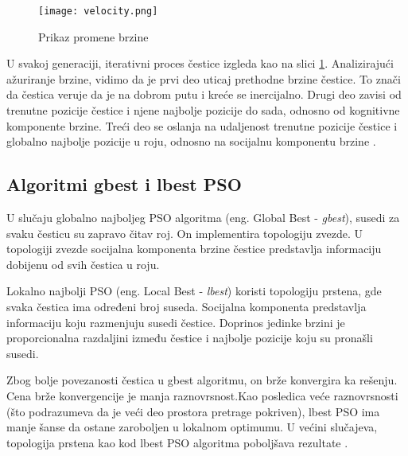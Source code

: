 \documentclass[a4paper]{article}
\begin{document}
\begin{figure}[htp]
    \centering
    \texttt{[image: velocity.png]}
    \caption{Prikaz promene brzine}
    \label{fig:velocity}
\end{figure}

U svakoj generaciji, iterativni proces čestice izgleda kao na slici \ref{fig:velocity}. Analizirajući ažuriranje brzine, vidimo da je prvi deo uticaj prethodne brzine čestice. To znači da čestica veruje da je na dobrom putu i kreće se inercijalno. Drugi deo zavisi od trenutne pozicije čestice i njene najbolje pozicije do sada, odnosno od kognitivne komponente brzine. Treći deo se oslanja na udaljenost trenutne pozicije čestice i globalno najbolje pozicije u roju, odnosno na socijalnu komponentu brzine \cite{wang2018particle}. 

\subsection{Algoritmi gbest i lbest PSO}
\label{subsec:podnaslov1}

U slučaju globalno najboljeg PSO algoritma (eng. Global Best - \textit{gbest}), susedi za svaku česticu su zapravo čitav roj. On implementira topologiju zvezde. U topologiji zvezde socijalna komponenta brzine čestice predstavlja informaciju dobijenu od svih čestica u roju. 

Lokalno najbolji PSO (eng. Local Best - \textit{lbest}) koristi topologiju prstena, gde svaka čestica ima određeni broj suseda. Socijalna komponenta predstavlja informaciju koju razmenjuju susedi čestice. Doprinos jedinke brzini je proporcionalna razdaljini između čestice i najbolje pozicije koju su pronašli susedi. 

Zbog bolje povezanosti čestica u gbest algoritmu, on brže konvergira ka rešenju. Cena brže konvergencije je manja raznovrsnost.Kao posledica veće raznovrsnosti (što podrazumeva da je veći deo prostora pretrage pokriven), lbest PSO ima manje šanse da ostane zaroboljen u lokalnom optimumu. U većini slučajeva, topologija prstena kao kod lbest PSO algoritma poboljšava rezultate \cite{engelbrecht2007computational}.
\end{document}
